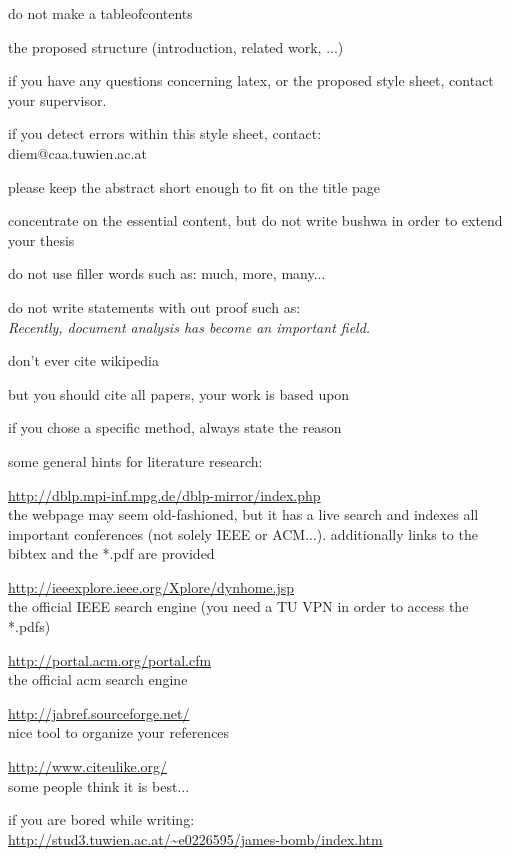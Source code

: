 \begin{itemized}
	\item do not make a tableofcontents
	\item the proposed structure (introduction, related work, ...)
	\item if you have any questions concerning latex, or the proposed
		style sheet, contact your supervisor.
	\item if you detect errors within this style sheet, contact: \\
		diem@caa.tuwien.ac.at
	\item please keep the abstract short enough to fit on the title page
	\item concentrate on the essential content, but do not write bushwa
	 	in order to extend your thesis
	\item do not use filler words such as: much, more, many...
	\item do not write statements with out proof such as: \\
		\textit{Recently, document analysis has become an important field.}
	\item don't ever cite wikipedia
	\item but you should cite all papers, your work is based upon
	\item if you chose a specific method, always state the reason
	\item some general hints for literature research:
		\begin{itemized}
			\item \url{http://dblp.mpi-inf.mpg.de/dblp-mirror/index.php} \\
				the webpage may seem old-fashioned, but it has 
  			a live search and indexes all important conferences
  			(not solely IEEE or ACM...). additionally links to 
  			the bibtex and the *.pdf are provided
			\item \url{http://ieeexplore.ieee.org/Xplore/dynhome.jsp} \\
  			the official IEEE search engine (you need a TU VPN
  			in order to access the *.pdfs)
			\item \url{http://portal.acm.org/portal.cfm} \\
	 			the official acm search engine
			\item \url{http://jabref.sourceforge.net/} \\
  			nice tool to organize your references
  		\item \url{http://www.citeulike.org/} \\
  			some people think it is best...
		\end{itemized}
	\item if you are bored while writing: \\
   \url{http://stud3.tuwien.ac.at/~e0226595/james-bomb/index.htm}
   
   
\end{itemized}

